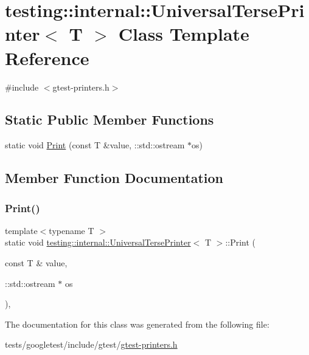 \hypertarget{classtesting_1_1internal_1_1UniversalTersePrinter}{}\section{testing\+:\+:internal\+:\+:Universal\+Terse\+Printer$<$ T $>$ Class Template Reference}
\label{classtesting_1_1internal_1_1UniversalTersePrinter}


{\ttfamily \#include $<$gtest-\/printers.\+h$>$}

\subsection*{Static Public Member Functions}
\begin{DoxyCompactItemize}
\item 
static void \hyperlink{classtesting_1_1internal_1_1UniversalTersePrinter_a042249cdb42fdb77588c9ad54ea7ed54}{Print} (const T \&value, \+::std\+::ostream $\ast$os)
\end{DoxyCompactItemize}


\subsection{Member Function Documentation}
\mbox{\label{classtesting_1_1internal_1_1UniversalTersePrinter_a042249cdb42fdb77588c9ad54ea7ed54}} 
\subsubsection{\texorpdfstring{Print()}{Print()}}
{\footnotesize\ttfamily template$<$typename T $>$ \\
static void \hyperlink{classtesting_1_1internal_1_1UniversalTersePrinter}{testing\+::internal\+::\+Universal\+Terse\+Printer}$<$ T $>$\+::Print (\begin{DoxyParamCaption}\item[{const T \&}]{value,  }\item[{\+::std\+::ostream $\ast$}]{os }\end{DoxyParamCaption})\hspace{0.3cm}{\ttfamily [inline]}, {\ttfamily [static]}}



The documentation for this class was generated from the following file\+:\begin{DoxyCompactItemize}
\item 
tests/googletest/include/gtest/\hyperlink{gtest-printers_8h}{gtest-\/printers.\+h}\end{DoxyCompactItemize}
